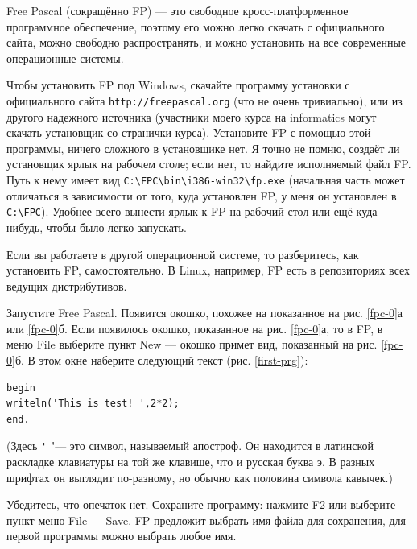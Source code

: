 
Free Pascal (сокращённо FP) — это свободное кросс-платформенное программное обеспечение, поэтому его можно легко
скачать с официального сайта, можно свободно распространять, и можно установить на все современные операционные
системы.

Чтобы установить FP под Windows, скачайте программу установки с официального сайта
\verb`http://freepascal.org` (что не очень тривиально), или из другого надежного источника (участники моего курса на informatics могут скачать установщик со странички курса).
Установите FP с помощью этой  программы, ничего сложного в установщике нет. Я точно не помню, создаёт ли установщик ярлык на 
рабочем столе; если нет, то найдите исполняемый файл FP. Путь к нему имеет вид 
\verb`C:\FPC\bin\i386-win32\fp.exe` (начальная часть может отличаться в зависимости от того, куда 
установлен FP, у меня он установлен в \verb`C:\FPC`). Удобнее всего вынести ярлык к FP на рабочий 
стол или ещё куда-нибудь, чтобы было легко запускать.

Если вы работаете в другой операционной системе, то разберитесь, как установить FP, самостоятельно. В Linux,
например, FP есть в репозиториях всех ведущих дистрибутивов.

Запустите Free Pascal. Появится окошко, похожее на показанное на рис. \ref{fpc-0}а или \ref{fpc-0}б. Если появилось окошко, показанное
на рис. \ref{fpc-0}а, то в FP, в меню File выберите пункт New — окошко примет вид, показанный на рис. \ref{fpc-0}б.
В этом окне наберите следующий текст (рис. \ref{first-prg}):
\begin{verbatim}
begin
writeln('This is test! ',2*2);
end.
\end{verbatim}
(Здесь \verb`'` "--- это символ, называемый апостроф. Он находится в латинской раскладке клавиатуры на той же клавише, что и русская буква э. В разных шрифтах он выглядит по-разному, но обычно как половина символа кавычек.)

Убедитесь, что опечаток нет. Сохраните программу: нажмите F2 или выберите пункт меню File --- Save. FP предложит
выбрать имя файла для сохранения, для первой программы можно выбрать любое имя.


